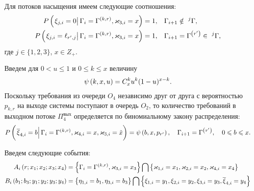 \documentclass[a4paper,12pt,russian]{extarticle}
\newcommand{\G}{\Gamma}
\renewcommand{\P}[2]{P\br{\left. #1 \right| #2}}
\newcommand{\ga}[1]{\Gamma^{\left( #1 \right)} }
\begin{document}
Для потоков насыщения имеем следующие соотношения:
\begin{align}
\P{\xi_{j,i} = 0}{\G_i=\ga{k,r}, \vk_{3,i} = x} = 1, &\quad \G_{i+1} \notin~^j\G,\\
\P{\xi_{j,i} = \ell_{r',j}}{\G_i=\ga{k,r}, \vk_{3,i} = x} = 1, &\quad \G_{i+1}=\ga{r'}\in~^j\G,
\end{align}
где $j\in \{1, 2, 3\}$, $x \in Z_+$.

Введем для $0 < u \leqslant 1$ и $0 \leqslant k \leqslant x$ величину
\begin{equation}
\psi\left(k,x,u\right) = C_x^k u^k (1-u)^{x-k}.
\end{equation}
Поскольку требования из очереди $O_4$ независимо друг от друга с вероятностью $p_{k,r}$ на выходе системы поступают в очередь $O_2$, то количество требований в выходном потоке $\Pi_4^{\mathrm{\text{вых}}}$ определяется по биномиальному закону распределения:
\begin{equation}
\P{\overline{\xi}_{4,i} = b}{ \G_i = \ga{k,r}, \vk_{4,i}=x, \vk_{3,i}=\tilde{x}}=\psi\br{b,x,p_{r'}}, \quad \G_{i+1}=\ga{r'}, \quad 0 \leqslant b \leqslant x.
\end{equation}


Введем следующие события:
\begin{align}
A_i\br{r;x_1;x_2;x_3;x_4} &= \brrr{\G_i=\ga{k,r},\vk_{3,i}=x_3}\bigcap \brrr{\vk_{1,i}=x_1,\vk_{2,i}=x_2,\vk_{4,i}=x_4}\\
B_i\br{b_1;b_3;y_1;y_2;y_3;y_4} &= \brrr{\eta_{1,i}=b_1,\eta_{3,i}=b_3} \bigcap \brrr{\xi_{1,i}=y_1,\xi_{2,i}=y_2,\xi_{3,i}=y_3,\overline{\xi}_{4,i}=y_4}
\end{align}
\end{document}
